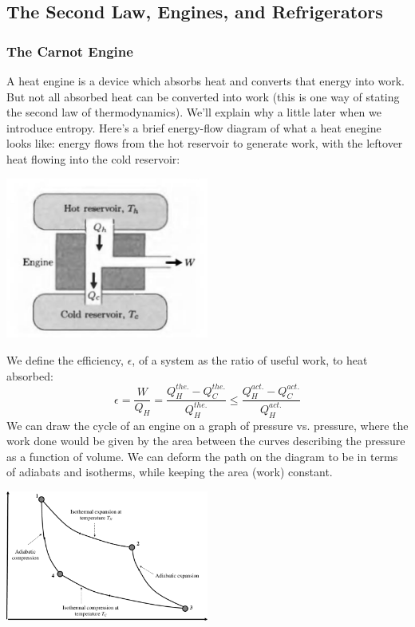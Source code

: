 \documentclass[a4paper]{article}
\begin{document}
\subsection{The Second Law, Engines, and Refrigerators}
\subsubsection{The Carnot Engine}
A heat engine is a device which absorbs heat and converts that energy into
work. But not all absorbed heat can be converted into work (this is one way of
stating the second law of thermodynamics). We'll explain why a little later
when we introduce entropy. Here's a brief energy-flow diagram of what a heat
enegine looks like: energy flows from the hot reservoir to generate work, with
the leftover heat flowing into the cold reservoir:
\begin{center}
	\includegraphics[width=0.5\textwidth]{Heat_Engine.png}
\end{center}
We define the efficiency, $\epsilon$, of a system as the ratio of useful work,
to heat absorbed:
\[
	\epsilon = \frac{W}{Q_H} = \frac{Q_H^{the.} - Q_C^{the.}}{Q_H^{the.}}
	\leq \frac{Q_H^{act.} - Q_C^{act.}}{Q_H^{act.}}
\]
We can draw the cycle of an engine on a graph of pressure vs. pressure, where
the work done would be given by the area between the curves describing the
pressure as a function of volume. We can deform the path on the diagram to be
in terms of adiabats and isotherms, while keeping the area (work) constant.
\begin{center}
	\includegraphics[width=0.5\textwidth]{Carnot.png}
\end{center}
\end{document}
